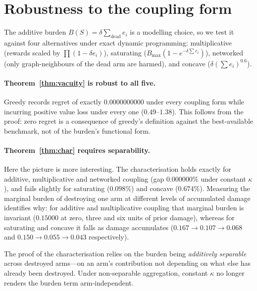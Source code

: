 
\section{Robustness to the coupling form}
\label{sec:robust}

The additive burden $B(S) = \delta\sum_{\text{dead}} e_i$ is a modelling choice, so
we test it against four alternatives under exact dynamic programming:
multiplicative (rewards scaled by $\prod(1-\delta e_i)$), saturating
($B_{\max}(1-e^{-\delta\sum e_i})$), networked (only graph-neighbours of the dead
arm are harmed), and concave ($\delta(\sum e_i)^{0.6}$).

\paragraph{Theorem~\ref{thm:vacuity} is robust to all five.} Greedy records regret
of exactly $0.0000000000$ under every coupling form while incurring positive value
loss under every one ($0.49$--$1.38$). This follows from the proof: zero regret is a
consequence of greedy's definition against the best-available benchmark, not of the
burden's functional form.

\paragraph{Theorem~\ref{thm:char} requires separability.} Here the picture is more
interesting. The characterisation holds exactly for additive, multiplicative and
networked coupling (gap $0.000000\%$ under constant $\kappa$), and fails slightly
for saturating ($0.098\%$) and concave ($0.674\%$). Measuring the marginal burden of
destroying one arm at different levels of accumulated damage identifies why: for
additive and multiplicative coupling that marginal burden is invariant
($0.15000$ at zero, three and six units of prior damage), whereas for saturating and
concave it falls as damage accumulates ($0.167 \to 0.107 \to 0.068$ and
$0.150 \to 0.055 \to 0.043$ respectively).

\begin{corollary}
The proof of the characterisation relies on the burden being \emph{additively
separable} across destroyed arms---on an arm's contribution not depending on
what else has already been destroyed. Under non-separable aggregation,
constant $\kappa$ no longer renders the burden term arm-independent.
\end{corollary}

